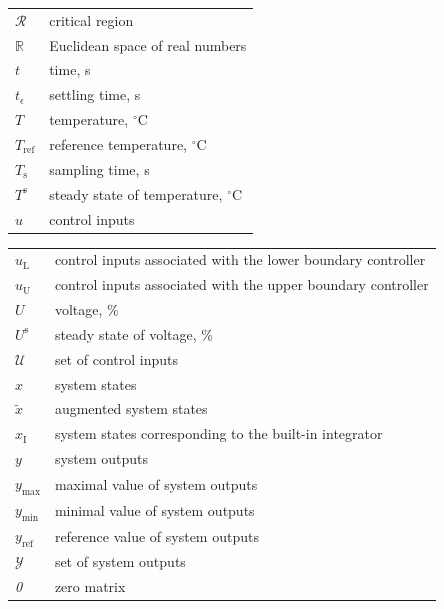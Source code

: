 \documentclass[preprint,12pt]{elsarticle}
\begin{document}
\begin{tabular}{ l l }
			$\mathcal{R}$ & critical region \\
			$\mathbb{R}$ & Euclidean space of real numbers \\
			$t$ & time, s \\
			$t_{\epsilon}$ & settling time, s \\
			$T$ & temperature, $^{\circ}\mathrm{C}$ \\
			$T_{\mathrm{ref}}$ & reference temperature, $^{\circ}\mathrm{C}$ \\
			$T_{\mathrm{s}}$ & sampling time, s \\
			$T^{\mathrm{s}}$ & steady state of temperature, $^{\circ}\mathrm{C}$ \\
			$u$ & control inputs \\
		\end{tabular}
	
	
		\begin{tabular}{ l l }
			$u_{\mathrm{L}}$ & control inputs associated with the lower boundary controller\\
			$u_{\mathrm{U}}$ & control inputs associated with the upper boundary controller\\
			$U$ & voltage, \% \\
			$U^{\mathrm{s}}$ & steady state of voltage, \% \\
			$\mathcal{U}$ & set of control inputs \\			
			$x$ & system states \\
			$\widetilde{x}$ & augmented system states \\
			$x_{\mathrm{I}}$ & system states corresponding to the built-in integrator \\
			$y$ & system outputs \\
			$y_\mathrm{\max}$ & maximal value of system outputs \\
			$y_\mathrm{\min}$ & minimal value of system outputs \\
			$y_\mathrm{ref}$ & reference value of system outputs \\
			$\mathcal{Y}$ & set of system outputs \\
			\textit{0} & zero matrix
		\end{tabular}
	
\end{document}
